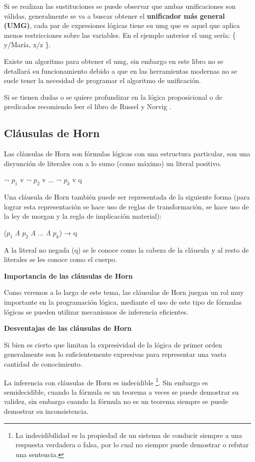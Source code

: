 \documentclass[11pt,fleqn]{book} %
\begin{document}
Si se realizan las sustituciones se puede observar que ambas unificaciones son válidas, generalmente se va a buscar obtener el \textbf{unificador más general (UMG)}, cada par de expresiones lógicas tiene su umg que es aquel que aplica menos restricciones sobre las variables. En el ejemplo anterior el umg sería: \{ y/María, x/z \}.

Existe un algoritmo para obtener el umg, sin embargo en este libro no se detallará su funcionamiento debido a que en las herramientas modernas no se suele tener la necesidad de programar el algoritmo de unificación.

Si se tienen dudas o se quiere profundizar en la lógica proposicional o de predicados recomiendo leer el libro de Russel y Norvig \cite{russell2004inteligencia}.

\subsection{Cláusulas de Horn} 


Las cláusulas de Horn son fórmulas lógicas con una estructura particular, son una disyunción de literales con a lo sumo (como máximo) un literal positivo.

¬ $p_1$ v ¬ $p_2$ v ... ¬ $p_k$ v q

Una cláusula de Horn también puede ser representada de la siguiente forma (para lograr esta representación se hace uso de reglas de transformación, se hace uso de la ley de morgan y la regla de implicación material):

($p_1$ $\Lambda$ $p_2$ $\Lambda$ ... $\Lambda$ $p_k$) → q

A la literal no negada (q) se le conoce como la cabeza de la cláusula y al resto de literales se les conoce como el cuerpo.

\textbf{Importancia de las cláusulas de Horn}

Como veremos a lo largo de este tema, las cláusulas de Horn juegan un rol muy importante en la programación lógica, mediante el uso de este tipo de fórmulas lógicas se pueden utilizar mecanismos de inferencia eficientes.

\textbf{Desventajas de las cláusulas de Horn}

Si bien es cierto que limitan la expresividad de la lógica de primer orden generalmente son lo suficientemente expresivas para representar una vasta cantidad de conocimiento.

La inferencia con cláusulas de Horn es indecidible \footnote{ La indecidibilidad es la propiedad de un sistema de conducir siempre a una respuesta verdadera o falsa, por lo cual no siempre puede demostrar o refutar una sentencia.}. Sin embargo es semidecidible, cuando la fórmula es un teorema a veces se puede demostrar su validez, sin embargo cuando la fórmula no es un teorema siempre se puede demostrar su inconsistencia.
\end{document}
